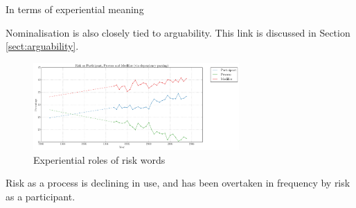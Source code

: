     In terms of experiential meaning

    Nominalisation is also closely tied to arguability. This link is discussed in Section \ref{sect:arguability}.




    \begin{figure}[htb!]
    \centering
    \includegraphics[width=0.7\textwidth]{../images/risk-as-participant-process-and-modifier-via-dependency-parsing.png}
    \caption{Experiential roles of risk words}
    \label{fig:funcrole}
    \end{figure}

    

    \vspace{5mm}\noindent\begin{tcolorbox}[colback=yellow!5,colframe=yellow!40!black,title=Summary: experiential function of risk words]
    \parbox{1\textwidth}{%
    Risk as a process is declining in use, and has been overtaken in frequency by risk as a participant.}
    \end{tcolorbox}
    \vspace{5mm}

